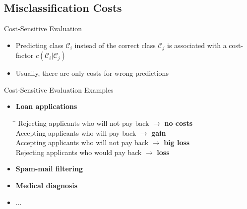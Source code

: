 \subsection{Misclassification Costs}

\begin{frame}{Cost-Sensitive Evaluation}{}
	\begin{itemize}
		\item Predicting class $\mathcal{C}_i$ instead of the correct class $\mathcal{C}_j$ is associated
			with a cost-factor $c(\mathcal{C}_i \vert \mathcal{C}_j)$
		\item Usually, there are only costs for wrong predictions
	\end{itemize}

\end{frame}


\begin{frame}{Cost-Sensitive Evaluation Examples}{}
	\begin{itemize}
		\item \textbf{Loan applications}
		\begin{tabbing}
			\hspace*{9cm}\= \kill
			Rejecting applicants who will not pay back 	\> $\rightarrow$ \textbf{no costs}	\\
			Accepting applicants who will pay back		\> $\rightarrow$ \textbf{gain}		\\
			Accepting applicants who will not pay back	\> $\rightarrow$ \textbf{big loss}	\\
			Rejecting applicants who would pay back		\> $\rightarrow$ \textbf{loss}
		\end{tabbing}
		\item \textbf{Spam-mail filtering}
		\item \textbf{Medical diagnosis}
		\item ...
	\end{itemize}
\end{frame}


